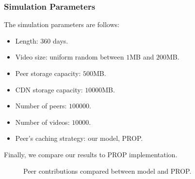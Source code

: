 \documentclass[10pt,final,journal,a4paper]{IEEEtran}
\begin{document}
\subsubsection{Simulation Parameters}
The simulation parameters are follows:

\begin{itemize}
\item Length: $360$ days.
\item Video size: uniform random between $1$MB and $200$MB.
\item Peer storage capacity: $500$MB.
\item CDN storage capacity: $10000$MB.
\item Number of peers: $100000$.
\item Number of videos: $10000$.
\item Peer's caching strategy: our model, PROP.
\end{itemize}
Finally, we compare our results to PROP \cite{1613869} implementation.




\begin{figure}[!t]
\centering
{}
\hfill
{}
\hfill
{}
\vspace{2mm}
\caption{Peer contributions compared between model and PROP.}
\label{fig:peercontribution}
\end{figure}
\end{document}
